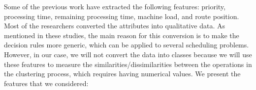 \documentclass[runningheads]{llncs}
\begin{document}
Some of the previous work \cite{koonce2000using, harrath2002genetic, shahzad2010discovering, ismail2012production, adibi2014clustering, nasiri2019data} have extracted the following features: priority, processing time, remaining processing time, machine load, and route position. Most of the researchers converted the attributes into qualitative data. As mentioned in these studies, the main reason for this conversion is to make the decision rules more generic, which can be applied to several scheduling problems. However, in our case, we will not convert the data into classes because we will use these features to measure the similarities/dissimilarities between the operations in the clustering process, which requires having numerical values.
We present the features that we considered:
\end{document}
